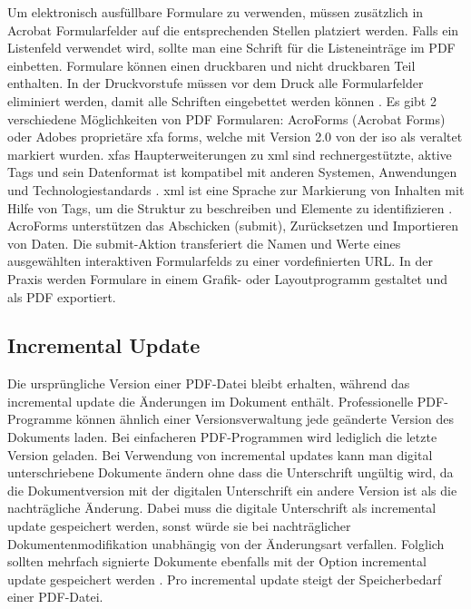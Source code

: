 Um elektronisch ausfüllbare Formulare zu verwenden, müssen zusätzlich in Acrobat Formularfelder auf die entsprechenden Stellen platziert werden. Falls ein Listenfeld verwendet wird, sollte man eine Schrift für die Listeneinträge im PDF einbetten. Formulare können einen druckbaren und nicht druckbaren Teil enthalten. In der Druckvorstufe müssen vor dem Druck alle Formularfelder eliminiert werden, damit alle Schriften eingebettet werden können \cite{schneeberger}. Es gibt 2 verschiedene Möglichkeiten von PDF Formularen: AcroForms (Acrobat Forms) oder Adobes proprietäre \gls{xfa} forms, welche mit Version 2.0 von der \gls{iso} als veraltet markiert wurden. \gls{xfa}s Haupterweiterungen zu \gls{xml} sind rechnergestützte, aktive Tags und sein Datenformat ist kompatibel mit anderen Systemen, Anwendungen und Technologiestandards \cite{wiki-xfa}. \gls{xml} ist eine Sprache zur Markierung von Inhalten mit Hilfe von Tags, um die Struktur zu beschreiben und Elemente zu identifizieren \cite{schneeberger}. AcroForms unterstützen das Abschicken (submit), Zurücksetzen und Importieren von Daten. Die submit-Aktion transferiert die Namen und Werte eines ausgewählten interaktiven Formularfelds zu einer vordefinierten URL. In der Praxis werden Formulare in einem Grafik- oder Layoutprogramm gestaltet und als PDF exportiert.

\subsection{Incremental Update}
Die ursprüngliche Version einer PDF-Datei bleibt erhalten, während das incremental update die Änderungen im Dokument enthält. Professionelle PDF-Programme können ähnlich einer Versionsverwaltung jede geänderte Version des Dokuments laden. Bei einfacheren PDF-Programmen wird lediglich die letzte Version geladen. Bei Verwendung von incremental updates kann man digital unterschriebene Dokumente ändern ohne dass die Unterschrift ungültig wird, da die Dokumentversion mit der digitalen Unterschrift ein andere Version ist als die nachträgliche Änderung. Dabei muss die digitale Unterschrift als incremental update gespeichert werden, sonst würde sie bei nachträglicher Dokumentenmodifikation unabhängig von der Änderungsart verfallen. Folglich sollten mehrfach signierte Dokumente ebenfalls mit der Option incremental update gespeichert werden \cite{softx}. Pro incremental update steigt der Speicherbedarf einer PDF-Datei.


